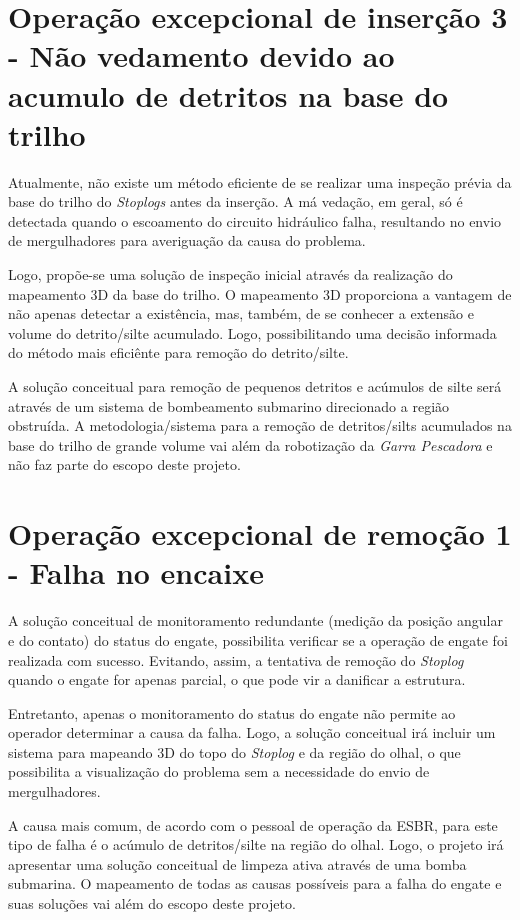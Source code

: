 


\section{Operação excepcional de inserção 3 - Não vedamento devido ao acumulo de detritos na base do trilho}

Atualmente, não existe um método eficiente de se realizar uma inspeção prévia da
base do trilho do \emph{Stoplogs} antes da inserção. A má vedação, em geral, só é
detectada quando o escoamento do circuito hidráulico falha, resultando no envio de mergulhadores para averiguação da causa do problema.

Logo, propõe-se uma solução de inspeção inicial através da realização do mapeamento 3D da base do trilho.
O mapeamento 3D proporciona a vantagem de não apenas detectar a existência,
mas, também, de se conhecer a extensão e volume do detrito/silte acumulado.
Logo, possibilitando uma decisão informada do método mais eficiênte para remoção do detrito/silte.

A solução conceitual para remoção de pequenos detritos e acúmulos de silte será
através de um sistema de bombeamento submarino direcionado a região obstruída. A metodologia/sistema para a remoção de detritos/silts acumulados na base do trilho de grande volume vai além da robotização da \emph{Garra Pescadora} e não faz parte do escopo deste projeto.



\section{Operação excepcional de remoção 1 - Falha no encaixe}

A solução conceitual de monitoramento redundante (medição da posição angular e
do contato) do status do engate, possibilita verificar se a operação de engate foi realizada com sucesso. Evitando, assim, a tentativa de remoção do \emph{Stoplog} quando o engate for apenas parcial, o que pode vir a danificar a estrutura.

Entretanto, apenas o monitoramento do status do engate não permite ao operador determinar a causa da falha. Logo, a solução conceitual irá incluir um sistema para mapeando 3D do topo do \emph{Stoplog} e da região do olhal, o que possibilita a visualização do problema sem a necessidade do envio
de mergulhadores. 

A causa mais comum, de acordo com o pessoal de operação da ESBR, para este tipo
de falha é o acúmulo de detritos/silte na região do olhal. Logo, o projeto irá apresentar uma solução conceitual de limpeza ativa através de uma bomba submarina. O mapeamento de todas as causas possíveis para a falha do engate e suas soluções vai além do escopo deste projeto.

